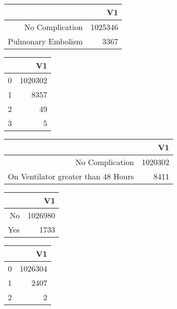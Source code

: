 \bigskip\bigskip
\centering
\begin{tabular}{rr}
  \hline
 & V1 \\ 
  \hline
No Complication & 1025346 \\ 
  Pulmonary Embolism & 3367 \\ 
   \hline
\end{tabular}

\bigskip\bigskip
\centering
\begin{tabular}{rr}
  \hline
 & V1 \\ 
  \hline
0 & 1020302 \\ 
  1 & 8357 \\ 
  2 &  49 \\ 
  3 &   5 \\ 
   \hline
\end{tabular}

\bigskip\bigskip
\centering
\begin{tabular}{rr}
  \hline
 & V1 \\ 
  \hline
No Complication & 1020302 \\ 
  On Ventilator greater than 48 Hours & 8411 \\ 
   \hline
\end{tabular}

\bigskip\bigskip
\centering
\begin{tabular}{rr}
  \hline
 & V1 \\ 
  \hline
No & 1026980 \\ 
  Yes & 1733 \\ 
   \hline
\end{tabular}

\bigskip\bigskip
\centering
\begin{tabular}{rr}
  \hline
 & V1 \\ 
  \hline
0 & 1026304 \\ 
  1 & 2407 \\ 
  2 &   2 \\ 
   \hline
\end{tabular}

